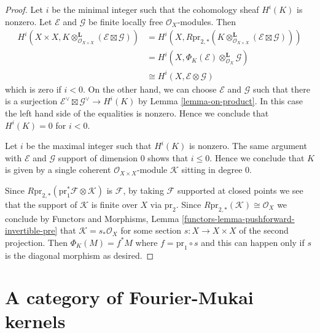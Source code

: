 \documentclass{stacks-project}
\theoremstyle{plain}
\theoremstyle{definition}
\theoremstyle{remark}
\numberwithin{equation}{subsection}
\begin{document}
\begin{proof}
Let $i$ be the minimal integer such that the cohomology sheaf $H^i(K)$ is
nonzero. Let $\mathcal{E}$ and $\mathcal{G}$ be finite locally free
$\mathcal{O}_X$-modules. Then
\begin{align*}
H^i(X \times X, K \otimes_{\mathcal{O}_{X \times X}}^\mathbf{L}
(\mathcal{E} \boxtimes \mathcal{G}))
& =
H^i(X, R\text{pr}_{2, *}(K \otimes_{\mathcal{O}_{X \times X}}^\mathbf{L}
(\mathcal{E} \boxtimes \mathcal{G}))) \\
& =
H^i(X, \Phi_K(\mathcal{E}) \otimes_{\mathcal{O}_X}^\mathbf{L} \mathcal{G}) \\
& \cong
H^i(X, \mathcal{E} \otimes \mathcal{G})
\end{align*}
which is zero if $i < 0$. On the other hand, we can choose
$\mathcal{E}$ and $\mathcal{G}$ such that there is a surjection
$\mathcal{E}^\vee \boxtimes \mathcal{G}^\vee \to H^i(K)$
by Lemma \ref{lemma-on-product}.
In this case the left hand side of the equalities is nonzero.
Hence we conclude that $H^i(K) = 0$ for $i < 0$.

\medskip\noindent
Let $i$ be the maximal integer such that $H^i(K)$ is nonzero.
The same argument with $\mathcal{E}$ and $\mathcal{G}$
support of dimension $0$ shows that $i \leq 0$.
Hence we conclude that $K$ is given by a single coherent
$\mathcal{O}_{X \times X}$-module $\mathcal{K}$ sitting in degree $0$.

\medskip\noindent
Since $R\text{pr}_{2, *}(\text{pr}_1^*\mathcal{F} \otimes \mathcal{K})$
is $\mathcal{F}$, by taking $\mathcal{F}$ supported at closed points
we see that the support of $\mathcal{K}$ is finite over $X$ via
$\text{pr}_2$. Since $R\text{pr}_{2, *}(\mathcal{K}) \cong \mathcal{O}_X$
we conclude by Functors and Morphisms, Lemma
\ref{functors-lemma-pushforward-invertible-pre}
that $\mathcal{K} = s_*\mathcal{O}_X$ for some section $s : X \to X \times X$
of the second projection. Then $\Phi_K(M) = f^*M$ where
$f = \text{pr}_1 \circ s$ and this can happen only if $s$
is the diagonal morphism as desired.
\end{proof}








\section{A category of Fourier-Mukai kernels}
\label{section-category-Fourier-Mukai-kernels}
\end{document}
